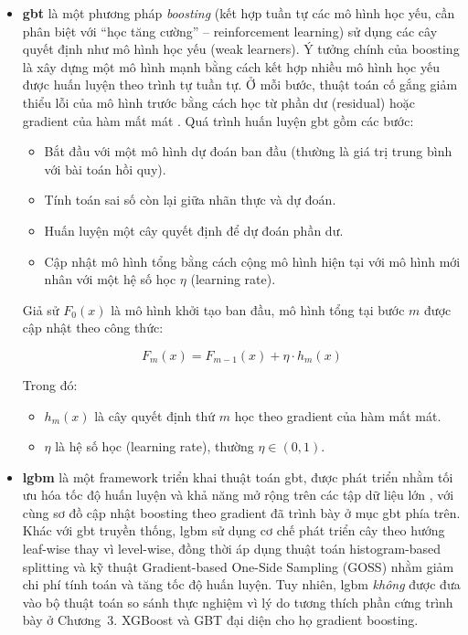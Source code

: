 \begin{itemize}
\item \textbf{\ac{gbt}} là một phương pháp \textit{boosting} (kết hợp tuần tự các mô hình học yếu, cần phân biệt với ``học tăng cường'' -- reinforcement learning) sử dụng các cây quyết định như mô hình học yếu (weak learners). Ý tưởng chính của boosting là xây dựng một mô hình mạnh bằng cách kết hợp nhiều mô hình học yếu được huấn luyện theo trình tự tuần tự. Ở mỗi bước, thuật toán cố gắng giảm thiểu lỗi của mô hình trước bằng cách học từ phần dư (residual) hoặc gradient của hàm mất mát \cite{friedman2001greedy}. Quá trình huấn luyện \ac{gbt} gồm các bước:
\begin{itemize}
    \item Bắt đầu với một mô hình dự đoán ban đầu (thường là giá trị trung bình với bài toán hồi quy).
    \item Tính toán sai số còn lại giữa nhãn thực và dự đoán.
    \item Huấn luyện một cây quyết định để dự đoán phần dư.
    \item Cập nhật mô hình tổng bằng cách cộng mô hình hiện tại với mô hình mới nhân với một hệ số học $\eta$ (learning rate).
\end{itemize}

Giả sử $F_0(x)$ là mô hình khởi tạo ban đầu, mô hình tổng tại bước $m$ được cập nhật theo công thức:

\begin{equation}
F_m(x) = F_{m-1}(x) + \eta \cdot h_m(x)
\end{equation}

Trong đó:
\begin{itemize}
    \item $h_m(x)$ là cây quyết định thứ $m$ học theo gradient của hàm mất mát.
    \item $\eta$ là hệ số học (learning rate), thường $\eta \in (0, 1)$.
\end{itemize}

\item \textbf{\ac{lgbm}} là một framework triển khai thuật toán \ac{gbt}, được phát triển nhằm tối ưu hóa tốc độ huấn luyện và khả năng mở rộng trên các tập dữ liệu lớn \cite{ke2017lightgbm}, với cùng sơ đồ cập nhật boosting theo gradient đã trình bày ở mục \ac{gbt} phía trên. Khác với \ac{gbt} truyền thống, \ac{lgbm} sử dụng cơ chế phát triển cây theo hướng leaf-wise thay vì level-wise, đồng thời áp dụng thuật toán histogram-based splitting và kỹ thuật Gradient-based One-Side Sampling (GOSS) nhằm giảm chi phí tính toán và tăng tốc độ huấn luyện. Tuy nhiên, \ac{lgbm} \emph{không} được đưa vào bộ thuật toán so sánh thực nghiệm vì lý do tương thích phần cứng trình bày ở Chương~3. XGBoost và GBT đại diện cho họ gradient boosting.


\end{itemize}
